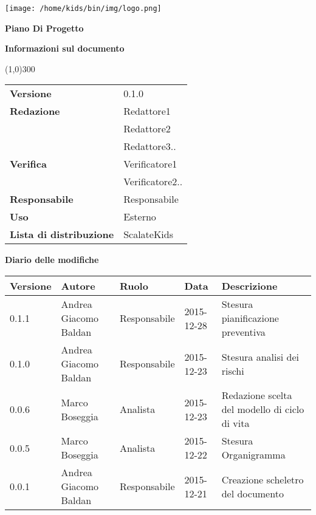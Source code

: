 \documentclass{scalatekids-article}
\begin{document}
\begin{titlepage}
  \centering
  \texttt{[image: /home/kids/bin/img/logo.png]}\par\vspace{1cm}
  \vspace{1.5cm}
         {\Huge\bfseries Piano Di Progetto \par}
         \begin{center}
           \vspace{1.0cm}
                  {\large\bfseries Informazioni sul documento \par}
         \end{center}
         \vspace{-1cm}
         \begin{center}
           \line(1,0){300}
         \end{center}
         \vspace{0cm}
         \begin{tabular}[c]{l|l}
           \textbf{Versione} & 0.1.0\\
           \textbf{Redazione} & Redattore1\\ & Redattore2\\ & Redattore3..\\
           \textbf{Verifica} & Verificatore1\\ & Verificatore2..\\
           \textbf{Responsabile} & Responsabile\\
           \textbf{Uso} & Esterno\\
           \textbf{Lista di distribuzione} & ScalateKids
         \end{tabular}
\end{titlepage}
\clearpage
\setcounter{page}{1}
\begin{flushleft}
  \vspace{0cm}
         {\large\bfseries Diario delle modifiche \par}
\end{flushleft}
\vspace{0cm}
\begin{center}
  \begin{tabular}{| l | l | l | l | l |}
    \hline
    Versione & Autore & Ruolo & Data & Descrizione \\
    \hline
    0.1.1 & Andrea Giacomo Baldan & Responsabile & 2015-12-28 & Stesura pianificazione preventiva\\
    \hline
    0.1.0 & Andrea Giacomo Baldan & Responsabile & 2015-12-23 & Stesura analisi dei rischi \\
    \hline
    0.0.6 & Marco Boseggia & Analista & 2015-12-23 & Redazione scelta del modello di ciclo di vita\\
    \hline
    0.0.5 & Marco Boseggia & Analista & 2015-12-22 & Stesura Organigramma\\
    \hline
    0.0.1 & Andrea Giacomo Baldan & Responsabile & 2015-12-21 & Creazione scheletro del documento\\
    \hline
  \end{tabular}
\end{center}
\tableofcontents
\newpage
\end{document}
